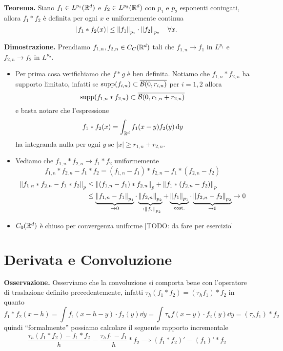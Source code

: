 \textbf{Teorema.}
Siano $f_1 \in L^{p_1}(\mathbb R^d)$ e $f_2 \in L^{p_2}(\mathbb R^d)$ con $p_1$ e $p_2$ esponenti coniugati, allora $f_1 \ast f_2$ è definita per ogni $x$ e uniformemente continua
$$
	|f_1 \ast f_2(x)| \leq \left\lVert f_1 \right\rVert_{p_1} \cdot \left\lVert f_2 \right\rVert_{p_2} \quad \forall x.
$$

\textbf{Dimostrazione.}
Prendiamo $f_{1,n}, f_{2, n} \in C_C(\mathbb R^d)$ tali che $f_{1, n} \to f_1$ in $L^{p_1}$ e $f_{2, n} \to f_2$ in $L^{p_2}$.
\begin{itemize}
	\item 
		Per prima cosa verifichiamo che $f \ast g$ è ben definita. Notiamo che $f_{1,n} \ast f_{2,n}$ ha supporto limitato, infatti se $\operatorname{supp}(f_{i,n}) \subset \overline{\mathcal{B}(0, r_{i,n})}$ per $i = 1, 2$ allora
		$$
		\operatorname{supp}(f_{1,n} \ast f_{2,n}) \subset \overline{\mathcal{B}(0, r_{1,n} + r_{2,n})}
		$$
		e basta notare che l'espressione
		$$
		f_1 \ast f_2(x) = \int_{\mathbb R^d} f_1(x - y) f_2(y) \,\mathrm{d} y
		$$
		ha integranda nulla per ogni $y$ se $|x| \geq r_{1,n} + r_{2,n}$.
	
	\item
		Vediamo che $f_{1,n} \ast f_{2,n} \to f_1 \ast f_2$ uniformemente
		$$
		f_{1,n} \ast f_{2,n} - f_1 \ast f_2 
		= (f_{1,n} - f_1) \ast f_{2,n} - f_1 \ast (f_{2,n} - f_2)
		$$
		$$
		\begin{aligned}
			\left\lVert f_{1,n} \ast f_{2,n} - f_1 \ast f_2 \right\rVert_p
			&\leq \left\lVert (f_{1,n} - f_1) \ast f_{2,n} \right\rVert_p + \left\lVert f_1 \ast (f_{2,n} - f_2) \right\rVert_p \\
			&\leq 
			\underbrace{\left\lVert f_{1,n} - f_1 \right\rVert_{p_1}}_{\to 0}
			\cdot \underbrace{\left\lVert f_{2,n} \right\rVert_{p_2}}_{\to \left\lVert f_2 \right\rVert_{p_2}}
			+ \underbrace{\left\lVert f_1 \right\rVert_{p_1}}_{\text{cost.}}
			\cdot \underbrace{\left\lVert f_{2,n} - f_2 \right\rVert_{p_2}}_{\to 0}
			\to 0
		\end{aligned}
		$$

	\item 
		$C_0(\mathbb R^d)$ è chiuso per convergenza uniforme [TODO: da fare per esercizio]
\end{itemize}

\section{Derivata e Convoluzione}

\textbf{Osservazione.}
Osserviamo che la convoluzione si comporta bene con l'operatore di traslazione definito precedentemente, infatti $\tau_h (f_1 \ast f_2) = (\tau_h f_1) \ast f_2$ in quanto
$$
f_1 \ast f_2 (x - h) 
= \int f_1(x - h - y) \cdot f_2(y) \dd y = \int \tau_h f(x - y) \cdot f_2(y) \dd y
= (\tau_h f_1) \ast f_2
$$
quindi ``formalmente'' possiamo calcolare il seguente rapporto incrementale
$$
\frac{\tau_h(f_1 \ast f_2) - f_1 \ast f_2}{h}
= \frac{\tau_h f_1 - f_1}{h} \ast f_2
\implies (f_1 \ast f_2)' = (f_1)' \ast f_2
$$

